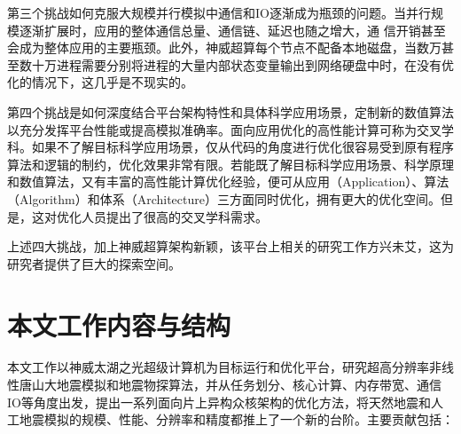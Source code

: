 \documentclass[degree=doctor]{thuthesis}
\begin{document}
第三个挑战如何克服大规模并行模拟中通信和IO逐渐成为瓶颈的问题。当并行规模逐渐扩展时，应用的整体通信总量、通信链、延迟也随之增大，通 信开销甚至会成为整体应用的主要瓶颈。此外，神威超算每个节点不配备本地磁盘，当数万甚至数十万进程需要分别将进程的大量内部状态变量输出到网络硬盘中时，在没有优化的情况下，这几乎是不现实的。

第四个挑战是如何深度结合平台架构特性和具体科学应用场景，定制新的数值算法以充分发挥平台性能或提高模拟准确率。面向应用优化的高性能计算可称为交叉学科。如果不了解目标科学应用场景，仅从代码的角度进行优化很容易受到原有程序算法和逻辑的制约，优化效果非常有限。若能既了解目标科学应用场景、科学原理和数值算法，又有丰富的高性能计算优化经验，便可从应用（Application）、算法（Algorithm）和体系（Architecture）三方面同时优化，拥有更大的优化空间。但是，这对优化人员提出了很高的交叉学科需求。

上述四大挑战，加上神威超算架构新颖，该平台上相关的研究工作方兴未艾，这为研究者提供了巨大的探索空间。

\section{本文工作内容与结构}

本文工作以神威太湖之光超级计算机为目标运行和优化平台，研究超高分辨率非线性唐山大地震模拟和地震物探算法，并从任务划分、核心计算、内存带宽、通信IO等角度出发，提出一系列面向片上异构众核架构的优化方法，将天然地震和人工地震模拟的规模、性能、分辨率和精度都推上了一个新的台阶。主要贡献包括：
\end{document}
